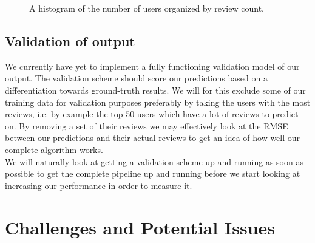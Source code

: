 \documentclass[10pt,twocolumn,letterpaper]{article}
\begin{document}
\begin{figure}[t]
\begin{center}
\end{center}
   \caption{A histogram of the number of users organized by review count.}
\label{fig:usrCnt}
\end{figure}

\subsection{Validation of output}
We currently have yet to implement a fully functioning validation model of our output. The validation scheme should score our predictions based on a differentiation towards ground-truth results. We will for this exclude some of our training data for validation purposes preferably by taking the users with the most reviews, i.e. by example the top 50 users which have a lot of reviews to predict on. By removing a set of their reviews we may effectively look at the RMSE between our predictions and their actual reviews to get an idea of how well our complete algorithm works.
\\[.5em]
\indent We will naturally look at getting a validation scheme up and running as soon as possible to get the complete pipeline up and running before we start looking at increasing our performance in order to measure it.

\section{Challenges and Potential Issues}
\end{document}
